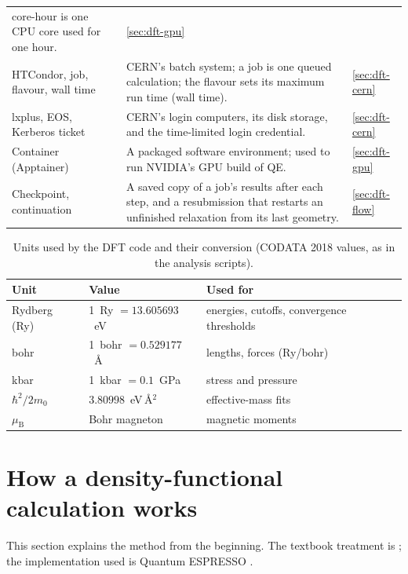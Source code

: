 \begin{small}
\begin{longtable}{@{}>{\raggedright\arraybackslash}p{3.3cm}>{\raggedright\arraybackslash}p{9.0cm}>{\raggedright\arraybackslash}p{1.6cm}@{}}
core-hour is one CPU core used for one hour. & \ref{sec:dft-gpu} \\
HTCondor, job, flavour, wall time & CERN's batch system; a job is one queued calculation; the flavour sets its maximum
run time (wall time). & \ref{sec:dft-cern} \\
lxplus, EOS, Kerberos ticket & CERN's login computers, its disk storage, and the time-limited login credential. & \ref{sec:dft-cern} \\
Container (Apptainer) & A packaged software environment; used to run NVIDIA's GPU build of QE. & \ref{sec:dft-gpu} \\
Checkpoint, continuation & A saved copy of a job's results after each step, and a resubmission that restarts an
unfinished relaxation from its last geometry. & \ref{sec:dft-flow} \\
\end{longtable}
\end{small}

\begin{table}[htbp]\centering\small
\caption{Units used by the DFT code and their conversion (CODATA 2018 values, as in the analysis scripts).}
\label{tab:dft-units}
\begin{tabular}{@{}lll@{}}
\toprule
Unit & Value & Used for \\
\midrule
Rydberg (Ry) & 1~Ry $= 13.605693$~eV & energies, cutoffs, convergence thresholds \\
bohr & 1~bohr $= 0.529177$~\AA & lengths, forces (Ry/bohr) \\
kbar & 1~kbar $= 0.1$~GPa & stress and pressure \\
$\hbar^2/2m_0$ & $3.80998$~eV\,\AA$^2$ & effective-mass fits \\
$\mu_{\mathrm{B}}$ & Bohr magneton & magnetic moments \\
\bottomrule
\end{tabular}
\end{table}

\section{How a density-functional calculation works}
\label{sec:dft-theory}

This section explains the method from the beginning. The textbook treatment is \citet{Martin2004}; the
implementation used is Quantum ESPRESSO \citep{Giannozzi2009,Giannozzi2017}.

